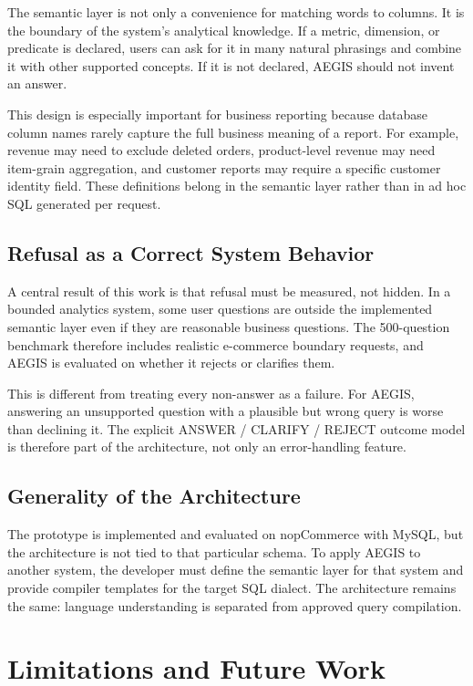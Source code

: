 \documentclass[pdflatex,sn-mathphys-num]{sn-jnl}
\begin{document}
The semantic layer is not only a convenience for matching words to columns. It is the boundary of the system's analytical knowledge. If a metric, dimension, or predicate is declared, users can ask for it in many natural phrasings and combine it with other supported concepts. If it is not declared, AEGIS should not invent an answer.


This design is especially important for business reporting because database column names rarely capture the full business meaning of a report. For example, revenue may need to exclude deleted orders, product-level revenue may need item-grain aggregation, and customer reports may require a specific customer identity field. These definitions belong in the semantic layer rather than in ad hoc SQL generated per request.


\subsection{Refusal as a Correct System Behavior}

A central result of this work is that refusal must be measured, not hidden. In a bounded analytics system, some user questions are outside the implemented semantic layer even if they are reasonable business questions. The 500-question benchmark therefore includes realistic e-commerce boundary requests, and AEGIS is evaluated on whether it rejects or clarifies them.


This is different from treating every non-answer as a failure. For AEGIS, answering an unsupported question with a plausible but wrong query is worse than declining it. The explicit ANSWER / CLARIFY / REJECT outcome model is therefore part of the architecture, not only an error-handling feature.


\subsection{Generality of the Architecture}

The prototype is implemented and evaluated on nopCommerce with MySQL, but the architecture is not tied to that particular schema. To apply AEGIS to another system, the developer must define the semantic layer for that system and provide compiler templates for the target SQL dialect. The architecture remains the same: language understanding is separated from approved query compilation.


\section{Limitations and Future Work}
\end{document}
